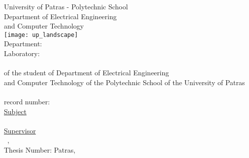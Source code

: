 \begin{titlepage}
\begin{center}
{\large University of Patras - Polytechnic School}\\
\large Department of Electrical Engineering\\and Computer Technology\\
\hfill \break
\texttt{[image: up\_landscape]}\\
\hfill \break
{\Large Department: \division \\
Laboratory: \lab }\\[1cm]

{\uline{\LARGE{\shortdoctitle }}}\\ [0.5cm]
of the student of Department of Electrical Engineering\\
and Computer Technology of the Polytechnic School of the University of Patras\\[1cm]

{\LARGE \me }\\[0.5cm]
{\Large record number: \studnum}\\[1cm]

\uline{\large Subject}\\[0.5cm]
\textbf{\large \doctitle }\\[1cm]
\uline{\large Supervisor}\\[0.5cm]
\large \suptitle \, \supname, \uni \\[1cm]
\large{Thesis Number: }\hspace{3cm}
\vfill
\large{Patras, \monthyear}
\end{center}
\end{titlepage}
